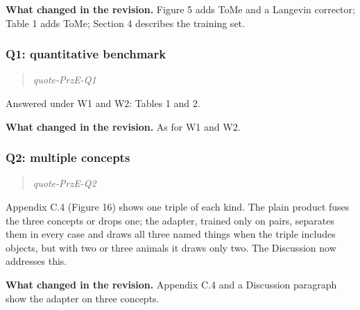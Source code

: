 \documentclass[11pt]{article}
\def\showquotes{}        %
\newcommand{\reviewquote}[2]{\ifdefined\showquotes\begin{quote}\color{rev}\itshape\csname quote-#1-#2\endcsname\end{quote}\fi}
\newcommand{\changed}[1]{\par{\color{chg}\textbf{What changed in the revision.}} #1\par}
\begin{document}
\changed{Figure 5 adds ToMe and a Langevin corrector; Table 1 adds ToMe; Section 4 describes the training set.}

\subsubsection*{Q1: quantitative benchmark}
\reviewquote{PrzE}{Q1}

Answered under W1 and W2: Tables 1 and 2.

\changed{As for W1 and W2.}

\subsubsection*{Q2: multiple concepts}
\reviewquote{PrzE}{Q2}

Appendix C.4 (Figure 16) shows one triple of each kind. The plain product fuses the three concepts or drops one; the adapter, trained only on pairs, separates them in every case and draws all three named things when the triple includes objects, but with two or three animals it draws only two. The Discussion now addresses this.

\changed{Appendix C.4 and a Discussion paragraph show the adapter on three concepts.}
\end{document}
